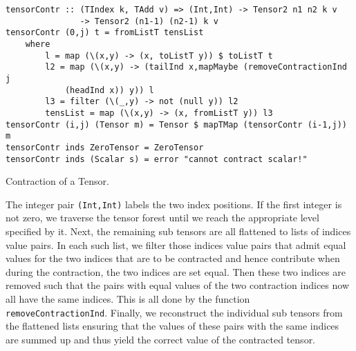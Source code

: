 \begin{listing}[hbt!] 
\begin{verbatim}
tensorContr :: (TIndex k, TAdd v) => (Int,Int) -> Tensor2 n1 n2 k v
               -> Tensor2 (n1-1) (n2-1) k v
tensorContr (0,j) t = fromListT tensList
    where
        l = map (\(x,y) -> (x, toListT y)) $ toListT t
        l2 = map (\(x,y) -> (tailInd x,mapMaybe (removeContractionInd j
            (headInd x)) y)) l
        l3 = filter (\(_,y) -> not (null y)) l2
        tensList = map (\(x,y) -> (x, fromListT y)) l3
tensorContr (i,j) (Tensor m) = Tensor $ mapTMap (tensorContr (i-1,j)) m
tensorContr inds ZeroTensor = ZeroTensor
tensorContr inds (Scalar s) = error "cannot contract scalar!"
\end{verbatim} 
\caption{Contraction of a Tensor.}\label{TensorContr}
\end{listing}

The integer pair \texttt{(Int,Int)} labels the two index positions. If the first integer is not zero, we traverse the tensor forest until we reach the appropriate level specified by it. Next, the remaining sub tensors are all flattened to lists of indices value pairs. In each such list, we filter those indices value pairs that admit equal values for the two indices that are to be contracted and hence contribute when during the contraction, the two indices are set equal. Then these two indices are removed such that the pairs with equal values of the two contraction indices now all have the same indices. This is all done by the function \texttt{removeContractionInd}. Finally, we reconstruct the individual sub tensors from the flattened lists ensuring that the values of these pairs with the same indices are summed up and thus yield the correct value of the contracted tensor. 

